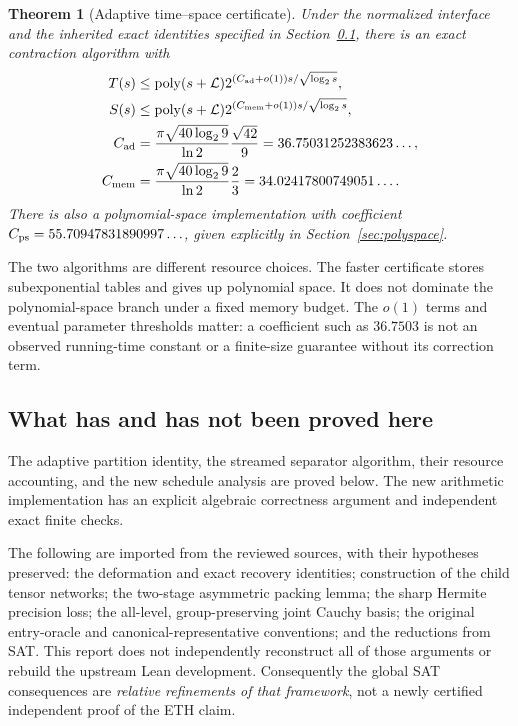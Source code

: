 \documentclass[11pt]{article}
\newtheorem{theorem}{Theorem}[section]
\theoremstyle{definition}\newtheorem{definition}[theorem]{Definition}
\theoremstyle{remark}\newtheorem{remark}[theorem]{Remark}
\newcommand{\poly}{\operatorname{poly}}
\begin{document}
\begin{theorem}[Adaptive time--space certificate]\label{thm:main}
Under the normalized interface and the inherited exact identities specified
in Section~\ref{sec:dependencies}, there is an exact contraction algorithm with
\begin{align}
 T(s)&\le\poly(s+\mathcal L)
 2^{(C_{\rm ad}+o(1))s/\sqrt{\log_2s}},\label{eq:main-time}\\
 S(s)&\le\poly(s+\mathcal L)
 2^{(C_{\rm mem}+o(1))s/\sqrt{\log_2s}},\label{eq:main-space}\\
 C_{\rm ad}&=\frac{\pi\sqrt{40\log_2 9}}{\ln2}\frac{\sqrt{42}}9
 =36.75031252383623\ldots,\notag\\
 C_{\rm mem}&=\frac{\pi\sqrt{40\log_2 9}}{\ln2}\frac23
 =34.02417800749051\ldots.\notag
\end{align}
There is also a polynomial-space implementation with coefficient
$C_{\rm ps}=55.70947831890997\ldots$, given explicitly in
Section~\ref{sec:polyspace}.
\end{theorem}

The two algorithms are different resource choices. The faster certificate
stores subexponential tables and gives up polynomial space. It does not
dominate the polynomial-space branch under a fixed memory budget.
The $o(1)$ terms and eventual parameter thresholds matter: a coefficient such
as $36.7503$ is not an observed running-time constant or a finite-size
guarantee without its correction term.

\subsection{What has and has not been proved here}
\label{sec:dependencies}

The adaptive partition identity, the streamed separator algorithm, their
resource accounting, and the new schedule analysis are proved below. The new arithmetic
implementation has an explicit algebraic correctness argument and independent
exact finite checks.

The following are imported from the reviewed sources, with their hypotheses
preserved: the deformation and exact recovery identities; construction of
the child tensor networks; the two-stage asymmetric packing lemma; the sharp
Hermite precision loss; the all-level, group-preserving joint Cauchy basis;
the original entry-oracle and canonical-representative conventions; and the
reductions from SAT. This report does not independently reconstruct all of
those arguments or rebuild the upstream Lean development. Consequently the
global SAT consequences are \emph{relative refinements of that framework},
not a newly certified independent proof of the ETH claim.
\end{document}
